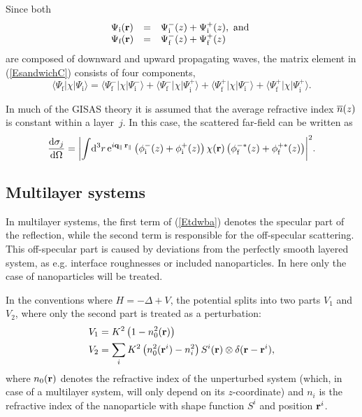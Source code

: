 Since both
\begin{equation}
  \begin{array}{lcl}
  \Psi_\text{i}(\mathbf{r})
  &=& \Psi^-_\text{i}(z) + \Psi^+_\text{i}(z), \text{ and }
  \\
  \Psi_\text{f}(\mathbf{r})
  &=& \Psi^-_\text{f}(z) + \Psi^+_\text{f}(z)
   \end{array}
\end{equation}
are composed of downward and upward propagating waves,
the matrix element in (\ref{EsandwichC}) consists of four components,
\begin{equation}\label{Ecross2}
  \langle \Psi_\text{f}|\chi|\Psi_\text{i}\rangle
  = \langle \Psi^-_\text{f}|\chi|\Psi^-_\text{i}\rangle
  + \langle \Psi^-_\text{f}|\chi|\Psi^+_\text{i}\rangle
  + \langle \Psi^+_\text{f}|\chi|\Psi^-_\text{i}\rangle
  + \langle \Psi^+_\text{f}|\chi|\Psi^+_\text{i}\rangle.
\end{equation}

In much of the GISAS theory it is assumed
that the average refractive index $\overline{n}(z)$ is constant within a layer~$j$.
In this case, the scattered far-field
can be written as
\begin{equation}\label{Ecross3}
  \frac{{\rm d}\sigma_j}{{\rm d}\Omega}
  = {\left|
    \int\!{\rm d}^3r\, {\rm e}^{i\mathbf{q}_\parallel\,\mathbf{r}_\parallel}
    \left(\phi^-_\text{i}(z) + \phi^+_\text{i}(z)\right)
    \chi(\mathbf{r})
    \left(\phi^{-*}_\text{f}(z) + \phi^{+*}_\text{f}(z)\right)
    \right|}^2.
\end{equation}


\subsection{Multilayer systems}

In multilayer systems, the first term of (\ref{Etdwba}) denotes the specular part of the reflection, while the second term is responsible for the off-specular scattering. This off-specular part is caused by deviations from the perfectly smooth layered system, as e.g. interface roughnesses or included nanoparticles. In here only the case of nanoparticles will be treated.

In the conventions where $H=-\Delta + V$, the potential splits into two parts $V_1$ and $V_2$, where only the second part is treated as a perturbation:
\begin{align*}
  V_1 & = K^2\left( 1-n_0^2(\mathbf{r})\right)  \\
  V_2 & = \sum_i K^2\left( n_0^2(\mathbf{r}^i) - n_i^2 \right) S^i(\mathbf{r}) \otimes \delta(\mathbf{r}-\mathbf{r}^i),
\end{align*}
where $n_0(\mathbf{r})$ denotes the refractive index of the unperturbed system (which, in case of a multilayer system, will only depend on its $z$-coordinate) and $n_i$ is the refractive index of the nanoparticle with shape function $S^i$ and position $\mathbf{r}^i$.

